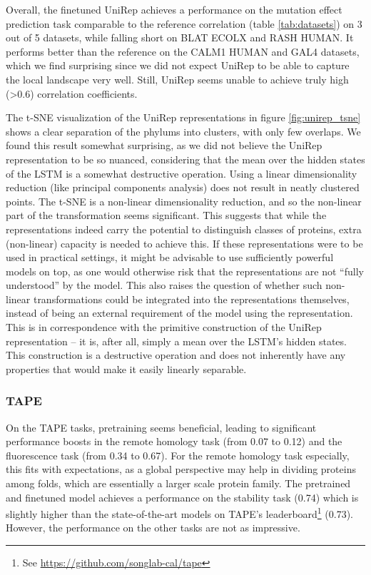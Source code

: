 Overall, the finetuned UniRep achieves a performance on the mutation effect prediction task comparable to the reference correlation (table \ref{tab:datasets}) on 3 out of 5 datasets, while falling short on BLAT ECOLX and RASH HUMAN. It performs better than the reference on the CALM1 HUMAN and GAL4 datasets, which we find surprising since we did not expect UniRep to be able to capture the local landscape very well. Still, UniRep seems unable to achieve truly high (>0.6) correlation coefficients.

The t-SNE visualization of the UniRep representations in figure \ref{fig:unirep_tsne} shows a clear separation of the phylums into clusters, with only few overlaps. We found this result somewhat surprising, as we did not believe the UniRep representation to be so nuanced, considering that the mean over the hidden states of the LSTM is a somewhat destructive operation. Using a linear dimensionality reduction (like principal components analysis) does not result in neatly clustered points. The t-SNE is a non-linear dimensionality reduction, and so the non-linear part of the transformation seems significant. This suggests that while the representations indeed carry the potential to distinguish classes of proteins, extra (non-linear) capacity is needed to achieve this. If these representations were to be used in practical settings, it might be advisable to use sufficiently powerful models on top, as one would otherwise risk that the representations are not ``fully understood'' by the model. This also raises the question of whether such non-linear transformations could be integrated into the representations themselves, instead of being an external requirement of the model using the representation. This is in correspondence with the primitive construction of the UniRep representation -- it is, after all, simply a mean over the LSTM's hidden states. This construction is a destructive operation and does not inherently have any properties that would make it easily linearly separable.

\subsubsection{TAPE}
On the TAPE tasks, pretraining seems beneficial, leading to significant performance boosts in the remote homology task (from 0.07 to 0.12) and the fluorescence task (from 0.34 to 0.67). For the remote homology task especially, this fits with expectations, as a global perspective may help in dividing proteins among folds, which are essentially a larger scale protein family. The pretrained and finetuned model achieves a performance on the stability task (0.74) which is slightly higher than the state-of-the-art models on TAPE's leaderboard\footnote{See \url{https://github.com/songlab-cal/tape}} (0.73). However, the performance on the other tasks are not as impressive.

